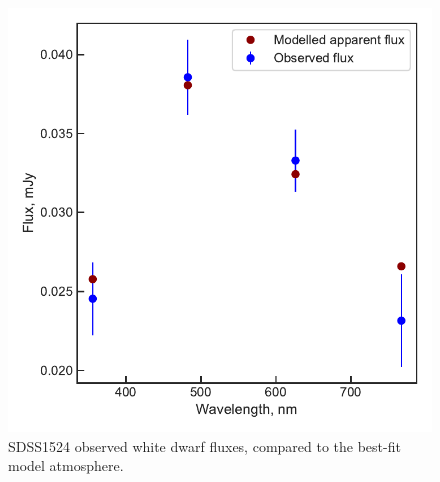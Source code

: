 \begin{figure}
    \centering
    \includegraphics[width=\textwidth]{figures/results/SDSS1524/fluxplot.pdf}
    \caption{SDSS1524 observed white dwarf fluxes, compared to the best-fit model atmosphere.}
    \label{fig:SDSS1524 flux plot}
\end{figure}
\clearpage






\newpage


